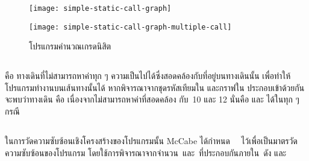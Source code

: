 {{\begin{figure}
    \begin{minipage}[t]{0.5\linewidth}
        \centering
        \texttt{[image: simple-static-call-graph]}
        \label{fig:subscggrading}
    \end{minipage}%
    \begin{minipage}[t]{0.5\linewidth}
        \centering
        \texttt{[image: simple-static-call-graph-multiple-call]}
        \label{fig:subactualscg}
    \end{minipage}%
    \caption{{\scg}โปรแกรมคำนวณเกรดนิสิต}
    \label{fig:scggrading}
\end{figure}

\subsection{\FirstTimeDefine{\InfeasiblePath}{\InfeasiblePathEN}}

\InfeasiblePath คือ ทางเดินที่ไม่สามารถหาค่าทุก ๆ ความเป็นไปได้ซึ่งสอดคล้องกับ{\PredicateNode}ที่อยู่บนทางเดินนั้น 
เพื่อทำให้โปรแกรมทำงานบนเส้นทางนั้นได้ \cite{Naik2008} หากพิจารณาจากชุดรหัสเทียมใน{} 
และกราฟใน{} ประกอบเข้าด้วยกัน จะพบว่าทางเดิน 
 คือ {\bf \InfeasiblePath} เนื่องจากไม่สามารถหาค่าที่สอดคล้อง
กับ\PredicateNode\ 10 และ 12 นั่นคือ  และ  ได้ในทุก ๆ กรณี

\subsection{\FirstTimeDefine{\Cyclomatic}{\CyclomaticEN}}

ในการวัดความซับซ้อนเชิงโครงสร้างของโปรแกรมนั้น McCabe ได้กำหนด \Cyclomatic\ \cite{McCabe1976}\ 
ไว้เพื่อเป็นมาตรวัดความซับซ้อนของโปรแกรม โดยใช้การพิจารณาจากจำนวน\Node\ \Edge และ\PredicateNode\ ที่ประกอบกันภายใน\ProgramGraph\ 
ดัง และ 

}}
